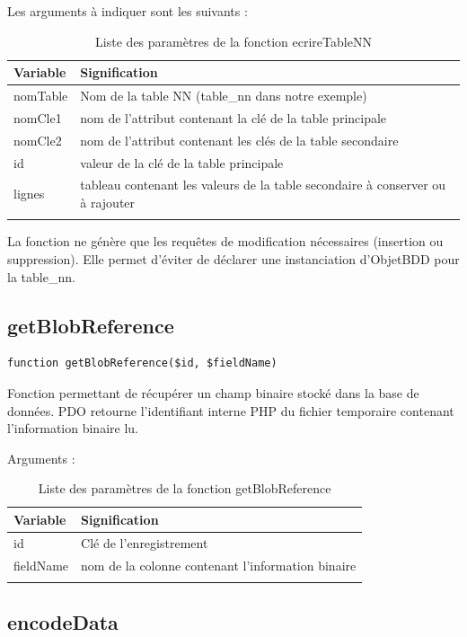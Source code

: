 Les arguments à indiquer sont les suivants :
\begin{longtable}{|p{3cm}|p{10cm}|}
\hline
\textbf{Variable} & \textbf{Signification} \\
\hline
\endhead
nomTable & Nom de la table NN (table\_nn dans notre exemple) \\
\hline
nomCle1 & nom de l'attribut contenant la clé de la table principale \\
\hline
nomCle2 & nom de l'attribut contenant les clés de la table secondaire \\
\hline
id & valeur de la clé de la table principale \\
\hline
lignes & tableau contenant les valeurs de la table secondaire à conserver ou à rajouter \\
\hline

\caption{Liste des paramètres de la fonction ecrireTableNN}
\end{longtable}

La fonction ne génère que les requêtes de modification nécessaires (insertion ou suppression). Elle permet d'éviter de déclarer une instanciation d'ObjetBDD pour la table\_nn.

\subsection{getBlobReference}

\begin{lstlisting}
function getBlobReference($id, $fieldName)
\end{lstlisting}

Fonction permettant de récupérer un champ binaire stocké dans la base de données. PDO retourne l'identifiant interne PHP du fichier temporaire contenant l'information binaire lu.

Arguments :
\begin{longtable}{|p{3cm}|p{10cm}|}
\hline
\textbf{Variable} & \textbf{Signification} \\
\hline
\endhead
id & Clé de l'enregistrement \\
\hline
fieldName & nom de la colonne contenant l'information binaire \\
\hline
\caption{Liste des paramètres de la fonction getBlobReference}
\end{longtable}

\subsection{encodeData}

